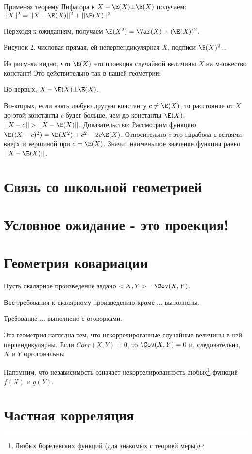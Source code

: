 Применяя теорему Пифагора к $X-\E(X)\bot \E(X)$ получаем:
$||X||^{2}=||X-\E(X)||^{2}+||\E(X)||^{2}$

Переходя к ожиданиям, получаем $\E(X^{2})=\Var(X)+(\E(X))^{2}$.

Рисунок 2. числовая прямая, ей неперпендикулярная $X$, подписи $\E(X)^{2}$...

Из рисунка видно, что $\E(X)$ это проекция случайной величины $X$ на множество констант! Это действительно так в нашей геометрии: 

Во-первых, $X-\E(X)\bot \E(X)$.

Во-вторых, если взять любую другую константу $c\neq \E(X)$, то расстояние от $X$ до этой константы $c$ будет больше, чем до константы $\E(X)$: $||X-c||>||X-\E(X)||$. Доказательство: Рассмотрим функцию $\E((X-c)^2)=\E(X^{2})+c^{2}-2c\E(X)$. Относительно $c$ это парабола с ветвями вверх и вершиной при $c=\E(X)$. Значит наименьшое значение функции равно $||X-\E(X)||$.



\section{Связь со школьной геометрией}

\section{Условное ожидание - это проекция!}


\section{Геометрия ковариации}
Пусть скалярное произведение задано $<X,Y>=\Cov(X,Y)$.

Все требования к скалярному произведению кроме ... выполнены.

Требование ... выполнено с оговорками.

Эта геометрия наглядна тем, что некоррелированные случайные величины в ней перпендикулярны.
Если $Corr(X,Y)=0$, то $\Cov(X,Y)=0$ и, следовательно, $X$ и $Y$ ортогональны.

Напомним, что независимость означает некоррелированность любых\footnote{Любых борелевских функций (для знакомых с теорией меры)} функций $f(X)$ и $g(Y)$.



\section{Частная корреляция}



